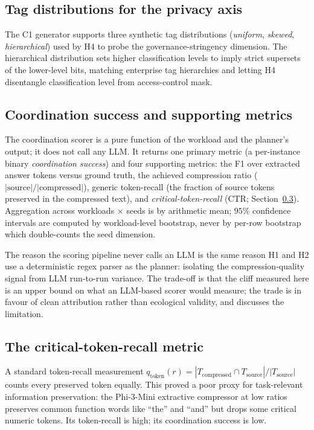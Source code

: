 \subsection{Tag distributions for the privacy axis}

The C1 generator supports three synthetic tag distributions
(\emph{uniform}, \emph{skewed}, \emph{hierarchical}) used by H4 to
probe the governance-stringency dimension. The hierarchical
distribution sets higher classification levels to imply strict
supersets of the lower-level bits, matching enterprise tag
hierarchies and letting H4 disentangle classification level from
access-control mask.

\subsection{Coordination success and supporting metrics}

The coordination scorer is a pure function of the workload and the
planner's output; it does not call any LLM. It returns one primary
metric (a per-instance binary \emph{coordination success}) and
four supporting metrics: the F1 over extracted answer tokens versus
ground truth, the achieved compression ratio
($|\text{source}|/|\text{compressed}|$), generic token-recall (the
fraction of source tokens preserved in the compressed text), and
\emph{critical-token-recall} (CTR; Section~\ref{sec:ctr}).
Aggregation across workloads $\times$ seeds is by arithmetic mean;
$95\%$ confidence intervals are computed by workload-level
bootstrap, never by per-row bootstrap which double-counts the seed
dimension.

The reason the scoring pipeline never calls an LLM is the same
reason H1 and H2 use a deterministic regex parser as the planner:
isolating the compression-quality signal from LLM run-to-run
variance. The trade-off is that the cliff measured here is an upper
bound on what an LLM-based scorer would measure; the trade is in
favour of clean attribution rather than ecological validity, and
 discusses the limitation.

\subsection{The critical-token-recall metric}
\label{sec:ctr}

A standard token-recall measurement
$q_\text{token}(r) = |T_\text{compressed} \cap T_\text{source}| /
|T_\text{source}|$ counts every preserved token equally. This proved
a poor proxy for task-relevant information preservation: the
Phi-3-Mini extractive compressor at low ratios preserves common
function words like ``the'' and ``and'' but drops some critical
numeric tokens. Its token-recall is high; its coordination success is low.

